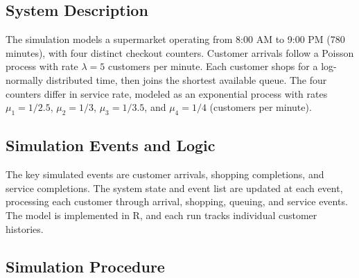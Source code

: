 \documentclass[
]{article}
\begin{document}
\justifying

\subsection{System Description}\label{system-description}

The simulation models a supermarket operating from 8:00 AM to 9:00 PM
(780 minutes), with four distinct checkout counters. Customer arrivals
follow a Poisson process with rate \(\lambda = 5\) customers per minute.
Each customer shops for a log-normally distributed time, then joins the
shortest available queue. The four counters differ in service rate,
modeled as an exponential process with rates \(\mu_1 = 1/2.5\),
\(\mu_2 = 1/3\), \(\mu_3 = 1/3.5\), and \(\mu_4 = 1/4\) (customers per
minute).

\subsection{Simulation Events and
Logic}\label{simulation-events-and-logic}

The key simulated events are customer arrivals, shopping completions,
and service completions. The system state and event list are updated at
each event, processing each customer through arrival, shopping, queuing,
and service events. The model is implemented in R, and each run tracks
individual customer histories.

\subsection{Simulation Procedure}\label{simulation-procedure}
\end{document}
